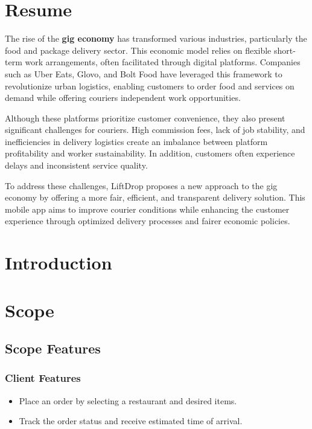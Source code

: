 \documentclass[a4paper,twoside,11pt]{article}
\begin{document}
\section{Resume} 

The rise of the \textbf{gig economy} has transformed various industries, particularly the food and package delivery sector. This economic model relies on flexible short-term work arrangements, often facilitated through digital platforms. Companies such as Uber Eats, Glovo, and Bolt Food have leveraged this framework to revolutionize urban logistics, enabling customers to order food and services on demand while offering couriers independent work opportunities.

\vspace{5mm}

Although these platforms prioritize customer convenience, they also present significant challenges for couriers. High commission fees, lack of job stability, and inefficiencies in delivery logistics create an imbalance between platform profitability and worker sustainability. In addition, customers often experience delays and inconsistent service quality.

\vspace{5mm}

To address these challenges, LiftDrop proposes a new approach to the gig economy by offering a more fair, efficient, and transparent delivery solution. This mobile app aims to improve courier conditions while enhancing the customer experience through optimized delivery processes and fairer economic policies.

\newpage

\section{Introduction}

\newpage

\section{Scope}

\subsection{Scope Features}  

\subsubsection{Client Features}  
\begin{itemize}
    \item Place an order by selecting a restaurant and desired items.
    \item Track the order status and receive estimated time of arrival.
\end{itemize}
\end{document}
